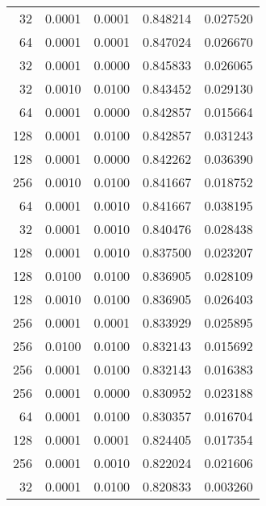 \begin{tabular}{rrrrr}
  32 &  0.0001 &  0.0001 &  0.848214 &  0.027520 \\
  64 &  0.0001 &  0.0001 &  0.847024 &  0.026670 \\
  32 &  0.0001 &  0.0000 &  0.845833 &  0.026065 \\
  32 &  0.0010 &  0.0100 &  0.843452 &  0.029130 \\
  64 &  0.0001 &  0.0000 &  0.842857 &  0.015664 \\
 128 &  0.0001 &  0.0100 &  0.842857 &  0.031243 \\
 128 &  0.0001 &  0.0000 &  0.842262 &  0.036390 \\
 256 &  0.0010 &  0.0100 &  0.841667 &  0.018752 \\
  64 &  0.0001 &  0.0010 &  0.841667 &  0.038195 \\
  32 &  0.0001 &  0.0010 &  0.840476 &  0.028438 \\
 128 &  0.0001 &  0.0010 &  0.837500 &  0.023207 \\
 128 &  0.0100 &  0.0100 &  0.836905 &  0.028109 \\
 128 &  0.0010 &  0.0100 &  0.836905 &  0.026403 \\
 256 &  0.0001 &  0.0001 &  0.833929 &  0.025895 \\
 256 &  0.0100 &  0.0100 &  0.832143 &  0.015692 \\
 256 &  0.0001 &  0.0100 &  0.832143 &  0.016383 \\
 256 &  0.0001 &  0.0000 &  0.830952 &  0.023188 \\
  64 &  0.0001 &  0.0100 &  0.830357 &  0.016704 \\
 128 &  0.0001 &  0.0001 &  0.824405 &  0.017354 \\
 256 &  0.0001 &  0.0010 &  0.822024 &  0.021606 \\
  32 &  0.0001 &  0.0100 &  0.820833 &  0.003260 \\
\bottomrule
\end{tabular}
